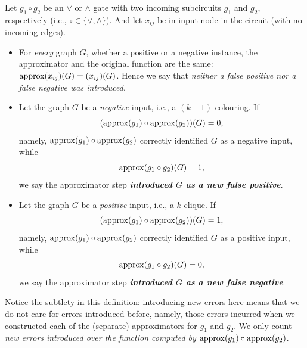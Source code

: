 

\begin{definition}\label{def:new-errors}
Let $g_1\circ g_2$ be an $\lor$ or $\land$ gate with two incoming subcircuits $g_1$ and $g_2$, respectively (i.e., $\circ\in\{\lor,\land\}$). And let $x_{ij}$ be in input node in the circuit (with no incoming edges).
\begin{itemize}
\item 
For \emph{every} graph $G$, whether a positive or a  negative instance, the approximator and the original function are the same:  
${\rm approx}(x_{ij})(G)=(x_{ij})(G)$. Hence we say that \emph{neither a false positive nor a false negative was introduced}.   
 
\item 
Let the graph $G$ be a \emph{negative} input, i.e., a $(k-1)$-colouring. If 
$$({\rm approx}(g_1)\circ {\rm approx}(g_2))(G)=0,$$ namely, ${\rm approx}(g_1)\circ {\rm approx}(g_2)$ correctly identified $G$ as a negative input, 
while $${\rm approx}(g_1\circ g_2)(G)=1,$$ we say the approximator 
step \emph{\textbf{introduced $G$ as a new false positive}}. 

\item Let the graph $G$ be a \emph{positive} input, i.e., a $k$-clique. If 
$$({\rm approx}(g_1) \circ {\rm approx}(g_2))(G)=1,$$
 namely, ${\rm approx}(g_1)\circ {\rm approx}(g_2)$ correctly identified $G$ as a positive input, while 
$${\rm approx}(g_1\circ g_2)(G)=0,$$ we say the approximator step \textbf{\emph{introduced $G$ as a new false negative}}.
\end{itemize}
\end{definition}

Notice the  subtlety in this definition: introducing new errors here means that we do not care for errors introduced before, namely, those errors incurred  when we constructed each of the (separate) approximators for $g_1$ and $g_2$. We only count \emph{new errors introduced over the function computed by ${\rm approx}(g_1)\circ {\rm approx}(g_2)$}.







